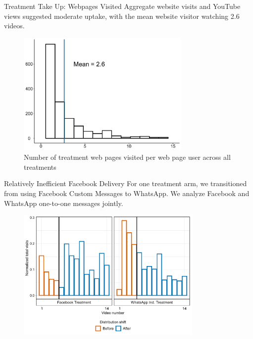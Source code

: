 \documentclass[10pt]{beamer}
\begin{document}
\begin{frame}{Treatment Take Up: Webpages Visited}
Aggregate website visits and YouTube views suggested moderate uptake, with the mean website visitor watching 2.6 videos.
\begin{figure}[H]
    \centering
    \includegraphics[height=6cm,width=8cm\linewidth]{Figures/Other/pages_all.pdf} 
    \caption{\scriptsize Number of treatment web pages visited per web page user across all treatments} 
\end{figure}
\end{frame}

\begin{frame}{Relatively Inefficient Facebook Delivery}
For one treatment arm, we transitioned from using Facebook Custom Messages to WhatsApp. We analyze Facebook and WhatsApp one-to-one messages jointly.
\begin{figure}[H]
\includegraphics[width=0.8\textwidth]{Figures/Other/dist_change.pdf}
\captionsetup{width=.85\linewidth}
\label{fig:fb_shifts}
\end{figure}
\end{frame}
\end{document}
